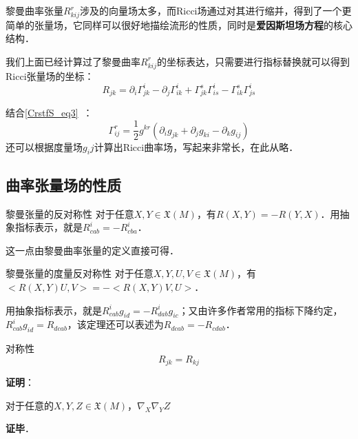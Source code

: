黎曼曲率张量$R^r_{kij}$涉及的向量场太多，而Ricci场通过对其进行缩并，得到了一个更简单的张量场，它同样可以很好地描绘流形的性质，同时是\textbf{爱因斯坦场方程}的核心结构．

我们上面已经计算过了黎曼曲率$R^r_{kij}$的坐标表达，只需要进行指标替换就可以得到Ricci张量场的坐标：
\begin{equation}
R_{jk}=\partial_i\Gamma^i_{jk}-\partial_j\Gamma^{i}_{ik}+\Gamma^s_{jk}\Gamma^i_{is}-\Gamma^s_{ik}\Gamma^i_{js}
\end{equation}

结合\autoref{CrstfS_eq3}~：
\begin{equation}
\Gamma^{r}_{ij}=\frac{1}{2}g^{kr}(\partial_ig_{jk}+\partial_jg_{ki}-\partial_kg_{ij})
\end{equation}
还可以根据度量场$g_ij$计算出Ricci曲率场，写起来非常长，在此从略．














\subsection{曲率张量场的性质}

\begin{theorem}{黎曼张量的反对称性}
对于任意$X, Y\in\mathfrak{X}(M)$，有$R(X, Y)=-R(Y, X)$．用抽象指标表示，就是$R^i_{cab}=-R^i_{cba}$．
\end{theorem}


这一点由黎曼曲率张量的定义直接可得．





\begin{theorem}{黎曼张量的度量反对称性}
对于任意$X, Y, U, V\in\mathfrak{X}(M)$，有$<R(X, Y)U, V>=-<R(X, Y)V, U>$．

用抽象指标表示，就是$R^i_{cab}g_{id}=-R^i_{dab}g_{ic}$；又由许多作者常用的指标下降约定，$R^i_{cab}g_{id}=R_{dcab}$，该定理还可以表述为$R_{dcab}=-R_{cdab}$．
\end{theorem}



\begin{theorem}{对称性}
\begin{equation}
R_{jk}=R_{kj}
\end{equation}
\end{theorem}

\textbf{证明}：

对于任意的$X, Y, Z\in\mathfrak{X}(M)$，$\nabla_{X}\nabla_{Y}Z$

\textbf{证毕}．


















